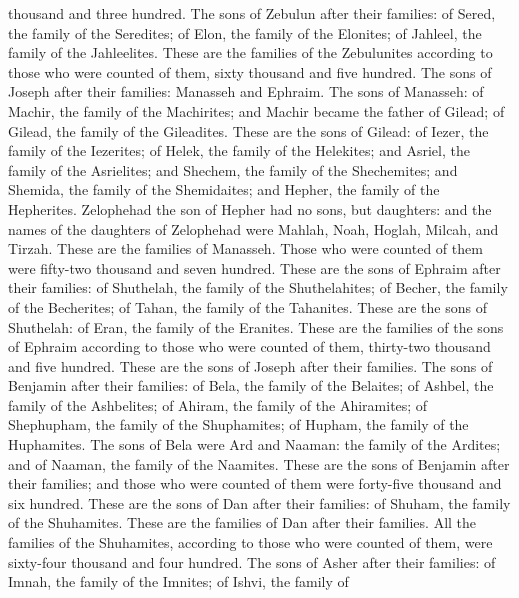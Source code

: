 thousand and three hundred.  The sons of Zebulun after
their families: of Sered, the family of the Seredites; of Elon, the
family of the Elonites; of Jahleel, the family of the Jahleelites.
 These are the families of the Zebulunites according to
those who were counted of them, sixty thousand and five hundred.
 The sons of Joseph after their families: Manasseh and
Ephraim.  The sons of Manasseh: of Machir, the family of
the Machirites; and Machir became the father of Gilead; of Gilead, the
family of the Gileadites.  These are the sons of Gilead:
of Iezer, the family of the Iezerites; of Helek, the family of the
Helekites;  and Asriel, the family of the Asrielites; and
Shechem, the family of the Shechemites;  and Shemida, the
family of the Shemidaites; and Hepher, the family of the Hepherites.
 Zelophehad the son of Hepher had no sons, but daughters:
and the names of the daughters of Zelophehad were Mahlah, Noah, Hoglah,
Milcah, and Tirzah.  These are the families of Manasseh.
Those who were counted of them were fifty-two thousand and seven
hundred.  These are the sons of Ephraim after their
families: of Shuthelah, the family of the Shuthelahites; of Becher, the
family of the Becherites; of Tahan, the family of the Tahanites.
 These are the sons of Shuthelah: of Eran, the family of
the Eranites.  These are the families of the sons of
Ephraim according to those who were counted of them, thirty-two thousand
and five hundred. These are the sons of Joseph after their families.
 The sons of Benjamin after their families: of Bela, the
family of the Belaites; of Ashbel, the family of the Ashbelites; of
Ahiram, the family of the Ahiramites;  of Shephupham, the
family of the Shuphamites; of Hupham, the family of the Huphamites.
 The sons of Bela were Ard and Naaman: the family of the
Ardites; and of Naaman, the family of the Naamites. 
These are the sons of Benjamin after their families; and those who were
counted of them were forty-five thousand and six hundred.
 These are the sons of Dan after their families: of
Shuham, the family of the Shuhamites. These are the families of Dan
after their families.  All the families of the
Shuhamites, according to those who were counted of them, were sixty-four
thousand and four hundred.  The sons of Asher after their
families: of Imnah, the family of the Imnites; of Ishvi, the family of
